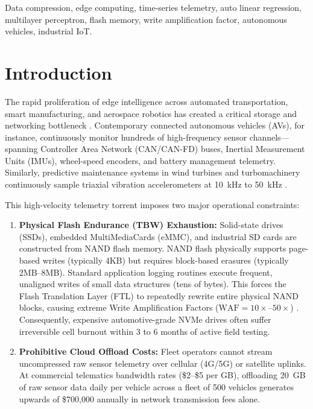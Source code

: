 \documentclass[journal]{IEEEtran}
\begin{document}
\begin{IEEEkeywords}
Data compression, edge computing, time-series telemetry, auto linear regression, multilayer perceptron, flash memory, write amplification factor, autonomous vehicles, industrial IoT.
\end{IEEEkeywords}

\section{Introduction}
The rapid proliferation of edge intelligence across automated transportation, smart manufacturing, and aerospace robotics has created a critical storage and networking bottleneck \cite{xu2015overview, pelkonen2015gorilla}. Contemporary connected autonomous vehicles (AVs), for instance, continuously monitor hundreds of high-frequency sensor channels---spanning Controller Area Network (CAN/CAN-FD) buses, Inertial Measurement Units (IMUs), wheel-speed encoders, and battery management telemetry. Similarly, predictive maintenance systems in wind turbines and turbomachinery continuously sample triaxial vibration accelerometers at 10~kHz to 50~kHz \cite{keogh2001segmentation}.

This high-velocity telemetry torrent imposes two major operational constraints:
\begin{enumerate}
    \item \textbf{Physical Flash Endurance (TBW) Exhaustion:} Solid-state drives (SSDs), embedded MultiMediaCards (eMMC), and industrial SD cards are constructed from NAND flash memory. NAND flash physically supports page-based writes (typically 4KB) but requires block-based erasures (typically 2MB--8MB). Standard application logging routines execute frequent, unaligned writes of small data structures (tens of bytes). This forces the Flash Translation Layer (FTL) to repeatedly rewrite entire physical NAND blocks, causing extreme Write Amplification Factors ($\text{WAF} = 10\times\text{--}50\times$) \cite{colavito2021write}. Consequently, expensive automotive-grade NVMe drives often suffer irreversible cell burnout within 3 to 6 months of active field testing.
    \item \textbf{Prohibitive Cloud Offload Costs:} Fleet operators cannot stream uncompressed raw sensor telemetry over cellular (4G/5G) or satellite uplinks. At commercial telematics bandwidth rates (\$2--\$5 per GB), offloading 20~GB of raw sensor data daily per vehicle across a fleet of 500 vehicles generates upwards of \$700,000 annually in network transmission fees alone.
\end{enumerate}
\end{document}
